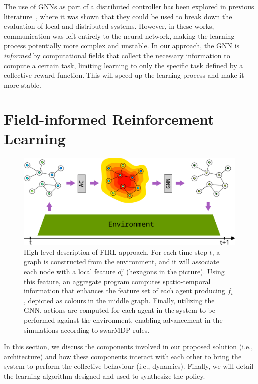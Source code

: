The use of \acp{GNN} as part of a distributed controller has been explored in previous literature~\cite{DBLP:conf/icra/GosrichMLPYR022,DBLP:conf/corl/TolstayaGPP0R19}, 
 where it was shown that they could be used to break down the evaluation of local and distributed systems. 
%
However, in these works, communication was left entirely to the neural network, 
 making the learning process potentially more complex and unstable. 
 In our approach, the \ac{GNN} is \emph{informed} by computational fields that collect the necessary information to compute a certain task, 
 limiting learning to only the specific task defined by a collective reward function.
 This will speed up the learning process and make it more stable.
\section{Field-informed Reinforcement Learning}
\label{sec:approach}
\begin{figure}
	\centering
  \includegraphics[width=.98\linewidth]{papers/acsos2023/imgs/architecture.pdf}

  \caption[High-level description of \ac{FIRL} approach.]{ High-level description of \ac{FIRL} approach. 
  For each time step $t$, a graph is constructed from the environment, and it will associate each node with a local feature $o^v_t$ (hexagons in the picture). 
  Using this feature, an aggregate program computes spatio-temporal information that enhances the feature set of each agent producing $f_v$, depicted as colours in the middle graph. 
  Finally, utilizing the GNN, actions are computed for each agent in the system to be performed against the environment, enabling advancement in the simulations according to swarMDP rules.
}  \label{fig:architecture}
\end{figure}
In this section, we discuss the components involved in our proposed solution (i.e., architecture) and how these components interact with each other to bring the system to perform the collective behaviour (i.e., dynamics). Finally, we will detail the learning algorithm designed and used to synthesize the policy.
